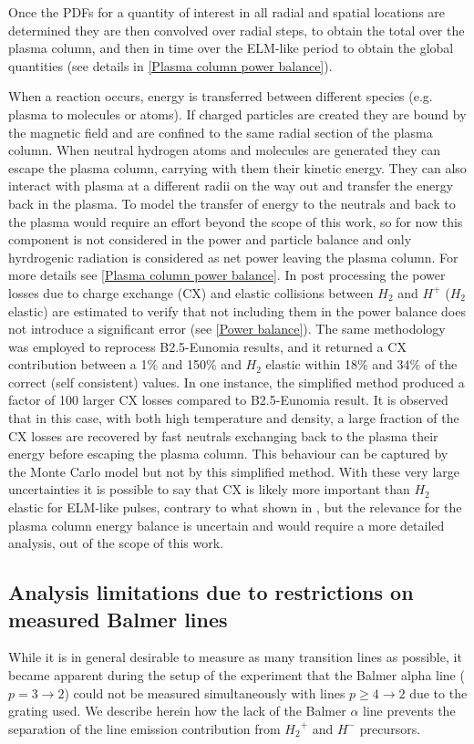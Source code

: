 Once the PDFs for a quantity of interest in all radial and spatial locations are determined they are then convolved over radial steps, to obtain the total over the plasma column, and then in time over the ELM-like period to obtain the global quantities (see details in \autoref{Plasma column power balance}).

When a reaction occurs, energy is transferred between different species (e.g. plasma to molecules or atoms). If charged particles are created they are bound by the magnetic field and are confined to the same radial section of the plasma column. When neutral hydrogen atoms and molecules are generated they can escape the plasma column, carrying with them their kinetic energy. They can also interact with plasma at a different radii on the way out and  transfer the energy back in the plasma. To model the transfer of energy to the neutrals and back to the plasma would require an effort beyond the scope of this work, so for now this component is not considered in the power and particle balance and only hyrdrogenic radiation is considered as net power leaving the plasma column. For more details see \autoref{Plasma column power balance}. In post processing the power losses due to charge exchange (CX) and elastic collisions between $H_2$ and $H^+$ ($H_2$ elastic) are estimated to verify that not including them in the power balance does not introduce a significant error (see \autoref{Power balance}). The same methodology was employed to reprocess B2.5-Eunomia results, and it returned a CX contribution between  a 1\% and 150\% and $H_2$ elastic within 18\% and 34\% of the correct (self consistent) values. In one instance, the simplified method produced a factor of 100 larger CX losses compared to B2.5-Eunomia result. It is observed that in this case, with both high temperature and density, a large fraction of the CX losses are recovered by fast neutrals exchanging back to the plasma their energy before escaping the plasma column. This behaviour can be captured by the Monte Carlo model but not by this simplified method. With these very large uncertainties it is possible to say that CX is likely more important than $H_2$ elastic for ELM-like pulses, contrary to what shown in \cite{Chandra2022}, but the relevance for the plasma column energy balance is uncertain and would require a more detailed analysis, out of the scope of this work.


\subsection{Analysis limitations due to restrictions on measured Balmer lines}\label{Limitations due to the measured lines}
While it is in general desirable to measure as many transition lines as possible, it became apparent during the setup of the experiment that the Balmer alpha line ($p=3\rightarrow 2$) could not be measured simultaneously with lines $p\geq 4\rightarrow 2$ due to the grating used. We describe herein how the lack of the Balmer $\alpha$ line prevents the separation of the line emission contribution from ${H_2}^+$ and ${H^-}$ precursors.

